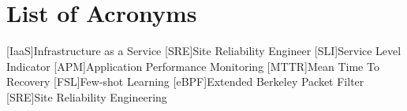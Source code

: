 \chapter*{List of Acronyms}

\begin{acronym}
[IaaS]{Infrastructure as a Service}
[SRE]{Site Reliability Engineer}
[SLI]{Service Level Indicator}
[APM]{Application Performance Monitoring}
[MTTR]{Mean Time To Recovery}
[FSL]{Few-shot Learning}
[eBPF]{Extended Berkeley Packet Filter}
[SRE]{Site Reliability Engineering}
\end{acronym}